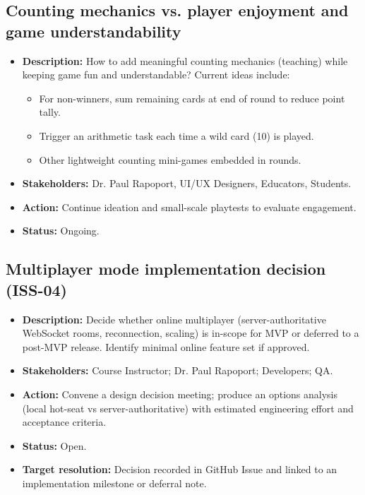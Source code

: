 \documentclass[12pt]{article}
\begin{document}
\subsection{Counting mechanics vs. player enjoyment and game understandability}
  \begin{itemize}
    \item \textbf{Description:} How to add meaningful counting mechanics (teaching) while keeping game fun and understandable? Current ideas include:
    \begin{itemize}
      \item For non-winners, sum remaining cards at end of round to reduce point tally.
      \item Trigger an arithmetic task each time a wild card (10) is played.
      \item Other lightweight counting mini-games embedded in rounds.
    \end{itemize}
    \item \textbf{Stakeholders:} Dr. Paul Rapoport, UI/UX Designers, Educators, Students.
    \item \textbf{Action:} Continue ideation and small-scale playtests to evaluate engagement.
    \item \textbf{Status:} Ongoing.
  \end{itemize}

\subsection{Multiplayer mode implementation decision (ISS-04)}
\begin{itemize}
  \item \textbf{Description:} Decide whether online multiplayer (server-authoritative WebSocket rooms, reconnection, scaling) is in-scope for MVP or deferred to a post-MVP release. Identify minimal online feature set if approved.
  \item \textbf{Stakeholders:} Course Instructor; Dr. Paul Rapoport; Developers; QA.
  \item \textbf{Action:} Convene a design decision meeting; produce an options analysis (local hot-seat vs server-authoritative) with estimated engineering effort and acceptance criteria.
  \item \textbf{Status:} Open.
  \item \textbf{Target resolution:} Decision recorded in GitHub Issue and linked to an implementation milestone or deferral note.
\end{itemize}
\end{document}
